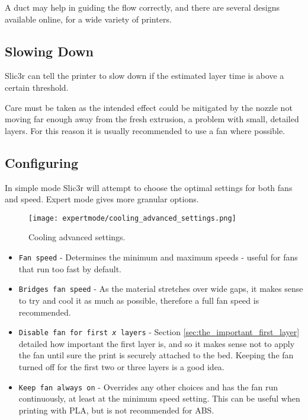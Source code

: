 A duct may help in guiding the flow correctly, and there are several designs available online, for a wide variety of printers.


\subsection{Slowing Down} %
\label{sub:slowing_down}
Slic3r can tell the printer to slow down if the estimated layer time is above a certain threshold.

Care must be taken as the intended effect could be mitigated by the nozzle not moving far enough away from the fresh extrusion, a problem with small, detailed layers.  For this reason it is usually recommended to use a fan where possible.


\subsection{Configuring} %
\label{sub:configuring_cooling}

In simple mode Slic3r will attempt to choose the optimal settings for both fans and speed.  Expert mode gives more granular options.  

\begin{figure}[H]
\centering
\texttt{[image: expertmode/cooling\_advanced\_settings.png]}
\caption{Cooling advanced settings.}
\label{fig:cooling_advanced_settings}
\end{figure}

\begin{itemize}
	\item \texttt{Fan speed}  - Determines the minimum and maximum speeds - useful for fans that run too fast by default.
	\item \texttt{Bridges fan speed}  - As the material stretches over wide gaps, it makes sense to try and cool it as much as possible, therefore a full fan speed is recommended.
	\item \texttt{Disable fan for first \textit{x} layers}  - Section \ref{sec:the_important_first_layer} detailed how important the first layer is, and so it makes sense not to apply the fan until sure the print is securely attached to the bed.  Keeping the fan turned off for the first two or three layers is a good idea.
	\item \texttt{Keep fan always on}  - Overrides any other choices and has the fan run continuously, at least at the minimum speed setting.  This can be useful when printing with PLA, but is not recommended for ABS.	
\end{itemize}

